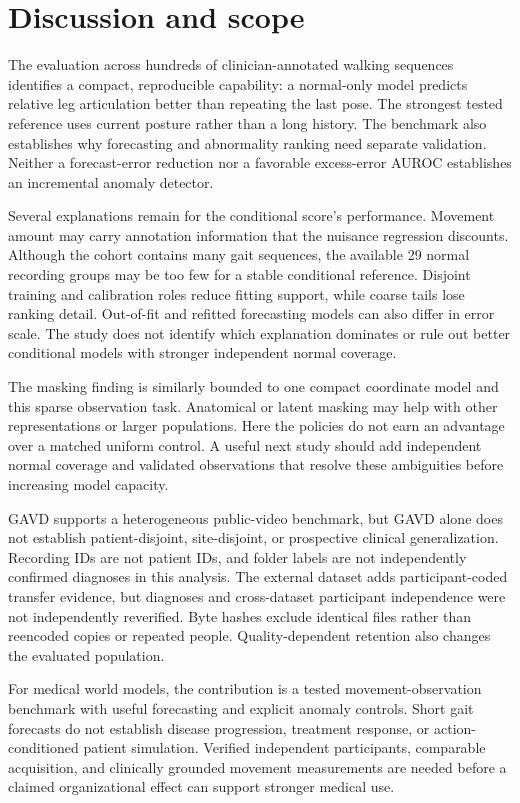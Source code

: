 \documentclass[letterpaper]{article}
\begin{document}
\section{Discussion and scope}

The evaluation across hundreds of clinician-annotated walking sequences identifies a compact, reproducible capability: a normal-only model predicts relative leg articulation better than repeating the last pose. The strongest tested reference uses current posture rather than a long history. The benchmark also establishes why forecasting and abnormality ranking need separate validation. Neither a forecast-error reduction nor a favorable excess-error AUROC establishes an incremental anomaly detector.

Several explanations remain for the conditional score's performance. Movement amount may carry annotation information that the nuisance regression discounts. Although the cohort contains many gait sequences, the available 29 normal recording groups may be too few for a stable conditional reference. Disjoint training and calibration roles reduce fitting support, while coarse tails lose ranking detail. Out-of-fit and refitted forecasting models can also differ in error scale. The study does not identify which explanation dominates or rule out better conditional models with stronger independent normal coverage.

The masking finding is similarly bounded to one compact coordinate model and this sparse observation task. Anatomical or latent masking may help with other representations or larger populations. Here the policies do not earn an advantage over a matched uniform control. A useful next study should add independent normal coverage and validated observations that resolve these ambiguities before increasing model capacity.

GAVD supports a heterogeneous public-video benchmark, but GAVD alone does not establish patient-disjoint, site-disjoint, or prospective clinical generalization. Recording IDs are not patient IDs, and folder labels are not independently confirmed diagnoses in this analysis. The external dataset adds participant-coded transfer evidence, but diagnoses and cross-dataset participant independence were not independently reverified. Byte hashes exclude identical files rather than reencoded copies or repeated people. Quality-dependent retention also changes the evaluated population.

For medical world models, the contribution is a tested movement-observation benchmark with useful forecasting and explicit anomaly controls. Short gait forecasts do not establish disease progression, treatment response, or action-conditioned patient simulation. Verified independent participants, comparable acquisition, and clinically grounded movement measurements are needed before a claimed organizational effect can support stronger medical use.
\end{document}
